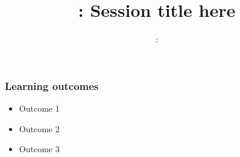 \usepackage{../beamerthemeFalmouthGamesAcademy}
\usepackage{multimedia}
\graphicspath{ {../} }


\usepackage[normalem]{ulem}
\usepackage{wasysym}

\usepackage{pdfpages}

\usetikzlibrary{arrows,automata}




\title{\sessionnumber: Session title here}
\subtitle{\modulecode: \moduletitle}

\frame{\titlepage} 

\begin{frame}
	\frametitle{Learning outcomes}
	\begin{itemize}
		\item Outcome 1
		\item Outcome 2
		\item Outcome 3
	\end{itemize}
\end{frame}


